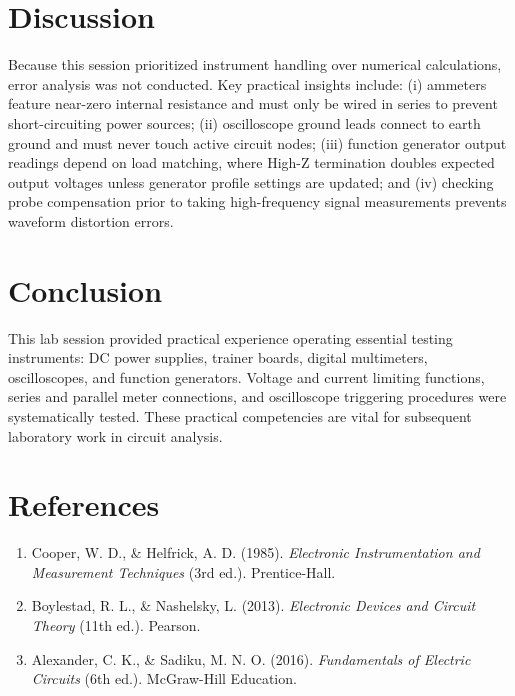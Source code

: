 \section{Discussion}
Because this session prioritized instrument handling over numerical calculations, error analysis was not conducted. Key practical insights include: (i) ammeters feature near-zero internal resistance and must only be wired in series to prevent short-circuiting power sources; (ii) oscilloscope ground leads connect to earth ground and must never touch active circuit nodes; (iii) function generator output readings depend on load matching, where High-Z termination doubles expected output voltages unless generator profile settings are updated; and (iv) checking probe compensation prior to taking high-frequency signal measurements prevents waveform distortion errors.

\section{Conclusion}
This lab session provided practical experience operating essential testing instruments: DC power supplies, trainer boards, digital multimeters, oscilloscopes, and function generators. Voltage and current limiting functions, series and parallel meter connections, and oscilloscope triggering procedures were systematically tested. These practical competencies are vital for subsequent laboratory work in circuit analysis.

\section{References}
\begin{tcolorbox}[colback=gray!5, colframe=gray!40, arc=2mm]
	\begin{enumerate}
		\item Cooper, W. D., \& Helfrick, A. D. (1985). \textit{Electronic Instrumentation and Measurement Techniques} (3rd ed.). Prentice-Hall.
		\item Boylestad, R. L., \& Nashelsky, L. (2013). \textit{Electronic Devices and Circuit Theory} (11th ed.). Pearson.
		\item Alexander, C. K., \& Sadiku, M. N. O. (2016). \textit{Fundamentals of Electric Circuits} (6th ed.). McGraw-Hill Education.
	\end{enumerate}
\end{tcolorbox}